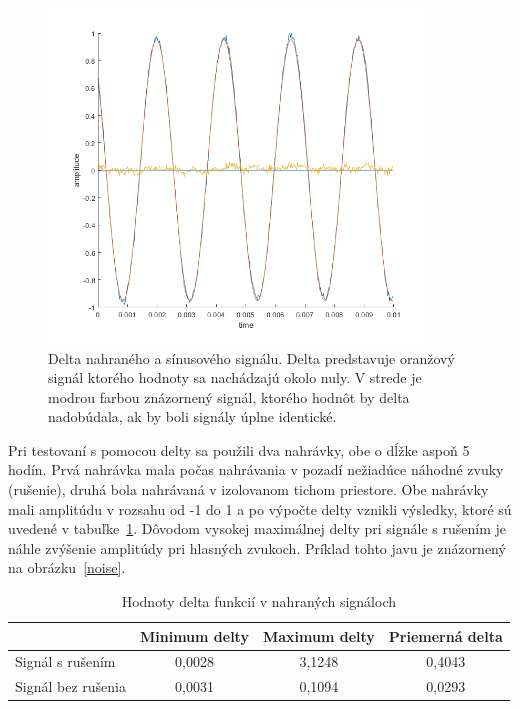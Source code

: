 \begin{figure}[!hbt]
	\centering
	\includegraphics[width=0.9\textwidth]{obrazky-figures/delta.png}
	\caption{Delta nahraného a sínusového signálu. Delta predstavuje oranžový signál ktorého hodnoty sa nachádzajú okolo nuly. V strede je modrou farbou znázornený signál, ktorého hodnôt by delta nadobúdala, ak by boli signály úplne identické.}
	\label{delta}
\end{figure}

Pri testovaní s pomocou delty sa použili dva nahrávky, obe o dĺžke aspoň 5 hodín. Prvá nahrávka mala počas nahrávania v pozadí nežiadúce náhodné zvuky (rušenie), druhá bola nahrávaná v izolovanom tichom priestore. Obe nahrávky mali amplitúdu v rozsahu od -1 do 1 a po výpočte delty vznikli výsledky, ktoré sú uvedené v tabuľke~\ref{deltas}. Dôvodom vysokej maximálnej delty pri signále s rušením je náhle zvýšenie amplitúdy pri hlasných zvukoch. Príklad tohto javu je znázornený na obrázku~\ref{noise}.

\begin{table}[hbt]
\centering
\caption{Hodnoty delta funkcií v nahraných signáloch}
\label{deltas}
\begin{tabular}{|l|c|c|c|}
\hline
 & Minimum delty & Maximum delty & Priemerná delta  \\ \hline
Signál s rušením & 0,0028 & 3,1248 & 0,4043 \\ \hline
Signál bez rušenia & 0,0031 & 0,1094  & 0,0293 \\ \hline
\end{tabular}
\end{table}

